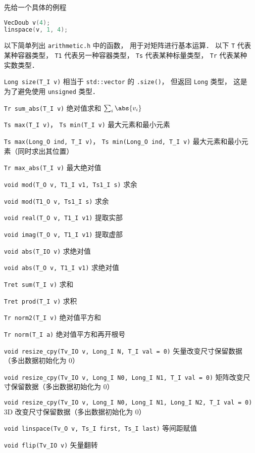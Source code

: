 

先给一个具体的例程
\begin{lstlisting}[language=cpp]
VecDoub v(4);
linspace(v, 1, 4);
\end{lstlisting}

以下简单列出 \verb|arithmetic.h| 中的函数， 用于对矩阵进行基本运算． 以下 \verb|T| 代表某种容器类型， \verb|T1| 代表另一种容器类型， \verb|Ts| 代表某种标量类型， \verb|Tr| 代表某种实数类型．

\verb|Long size(T_I v)| 相当于 \verb|std::vector| 的 \verb|.size()|， 但返回 \verb|Long| 类型， 这是为了避免使用 \verb|unsigned| 类型．

\verb|Tr sum_abs(T_I v)| 绝对值求和 $\sum_i \abs{v_i}$

\verb|Ts max(T_I v)|， \verb|Ts min(T_I v)| 最大元素和最小元素

\verb|Ts max(Long_O ind, T_I v)|， \verb|Ts min(Long_O ind, T_I v)| 最大元素和最小元素（同时求出其位置）

\verb|Tr max_abs(T_I v)| 最大绝对值

\verb|void mod(T_O v, T1_I v1, Ts1_I s)| 求余

\verb|void mod(T1_O v, Ts1_I s)| 求余

\verb|void real(T_O v, T1_I v1)| 提取实部

\verb|void imag(T_O v, T1_I v1)| 提取虚部

\verb|void abs(T_IO v)| 求绝对值

\verb|void abs(T_O v, T1_I v1)| 求绝对值

\verb|Tret sum(T_I v)| 求和

\verb|Tret prod(T_I v)| 求积

\verb|Tr norm2(T_I v)| 绝对值平方和

\verb|Tr norm(T_I a)| 绝对值平方和再开根号

\verb|void resize_cpy(Tv_IO v, Long_I N, T_I val = 0)| 矢量改变尺寸保留数据（多出数据初始化为 0）

\verb|void resize_cpy(Tv_IO v, Long_I N0, Long_I N1, T_I val = 0)| 矩阵改变尺寸保留数据（多出数据初始化为 0）

\verb|void resize_cpy(Tv_IO v, Long_I N0, Long_I N1, Long_I N2, T_I val = 0)| 3D 改变尺寸保留数据（多出数据初始化为 0）

\verb|void linspace(Tv_O v, Ts_I first, Ts_I last)| 等间距赋值

\verb|void flip(Tv_IO v)| 矢量翻转

